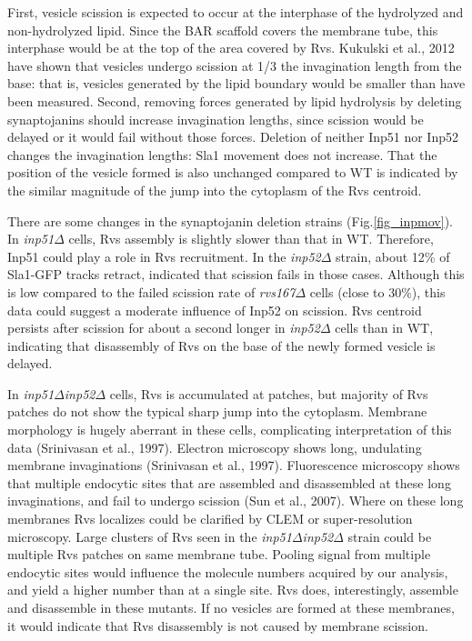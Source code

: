 \vspace{5mm}

First, vesicle scission is expected to occur at the interphase of the hydrolyzed and non-hydrolyzed lipid. Since the BAR scaffold covers the membrane tube, this interphase would be at the top of the area covered by Rvs. Kukulski et al., 2012 have shown that vesicles undergo scission at 1/3 the invagination length from the base: that is, vesicles generated by the lipid boundary would be smaller than have been measured. Second, removing forces generated by lipid hydrolysis by deleting synaptojanins should increase invagination lengths, since scission would be delayed or it would fail without those forces. Deletion of neither Inp51 nor Inp52 changes the invagination lengths: Sla1 movement does not increase. That the position of the vesicle formed is also unchanged compared to WT is indicated by the similar magnitude of the jump into the cytoplasm of the Rvs centroid. 


\vspace{5mm}
There are some changes in the synaptojanin deletion strains (Fig.\ref{fig_inpmov}). In \textit{inp51$\Delta$} cells, Rvs assembly is slightly slower than that in WT. Therefore, Inp51 could play a role in Rvs recruitment. In the \textit{inp52$\Delta$} strain, about 12\% of Sla1-GFP tracks retract, indicated that scission fails in those cases. Although this is low compared to the failed scission rate of \textit{rvs167$\Delta$} cells (close to 30\%), this data could suggest a moderate influence of Inp52 on scission. Rvs centroid persists after scission for about a second longer in \textit{inp52$\Delta$} cells than in WT, indicating that disassembly of Rvs on the base of the newly formed vesicle is delayed.

\vspace{5mm}
In \textit{inp51$\Delta$}\textit{inp52$\Delta$} cells, Rvs is accumulated at patches, but majority of Rvs patches do not show the typical sharp jump into the cytoplasm. Membrane morphology is hugely aberrant in these cells, complicating interpretation of this data (Srinivasan et al., 1997). Electron microscopy shows long, undulating membrane invaginations (Srinivasan et al., 1997). Fluorescence microscopy shows that multiple endocytic sites that are assembled and disassembled at these long invaginations, and fail to undergo scission (Sun et al., 2007). Where on these long membranes Rvs localizes could be clarified by CLEM or super-resolution microscopy. Large clusters of Rvs seen in the \textit{inp51$\Delta$}\textit{inp52$\Delta$} strain could be multiple Rvs patches on same membrane tube. Pooling signal from multiple endocytic sites would influence the molecule numbers acquired by our analysis, and yield a higher number than at a single site. Rvs does, interestingly, assemble and disassemble in these mutants. If no vesicles are formed at these membranes, it would indicate that Rvs disassembly is not caused by membrane scission.


